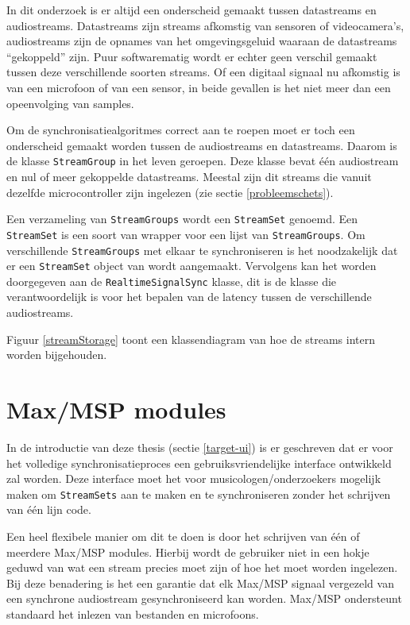In dit onderzoek is er altijd een onderscheid gemaakt tussen datastreams en audiostreams. Datastreams zijn streams afkomstig van sensoren of videocamera's, audiostreams zijn de opnames van het omgevingsgeluid waaraan de datastreams ``gekoppeld'' zijn. Puur softwarematig wordt er echter geen verschil gemaakt tussen deze verschillende soorten streams. Of een digitaal signaal nu afkomstig is van een microfoon of van een sensor, in beide gevallen is het niet meer dan een opeenvolging van samples.

Om de synchronisatiealgoritmes correct aan te roepen moet er toch een onderscheid gemaakt worden tussen de audiostreams en datastreams. Daarom is de klasse \texttt{StreamGroup} in het leven geroepen. Deze klasse bevat één audiostream en nul of meer gekoppelde datastreams. Meestal zijn dit streams die vanuit dezelfde microcontroller zijn ingelezen (zie sectie \ref{probleemschets}).

Een verzameling van \texttt{StreamGroups} wordt een \texttt{StreamSet} genoemd. Een \texttt{StreamSet} is een soort van wrapper voor een lijst van \texttt{StreamGroups}. Om verschillende \texttt{StreamGroups} met elkaar te synchroniseren is het noodzakelijk dat er een \texttt{StreamSet} object van wordt aangemaakt. Vervolgens kan het worden doorgegeven aan de  \texttt{RealtimeSignalSync} klasse, dit is de klasse die verantwoordelijk is voor het bepalen van de latency tussen de verschillende audiostreams. 

Figuur \ref{streamStorage} toont een klassendiagram van hoe de streams intern worden bijgehouden.

\section{Max/MSP modules}

In de introductie van deze thesis (sectie \ref{target-ui}) is er geschreven dat er voor het volledige synchronisatieproces een gebruiksvriendelijke interface ontwikkeld zal worden. Deze interface moet het voor musicologen/onderzoekers mogelijk maken om \texttt{StreamSets} aan te maken en te synchroniseren zonder het schrijven van één lijn code.

Een heel flexibele manier om dit te doen is door het schrijven van één of meerdere Max/MSP modules. Hierbij wordt de gebruiker niet in een hokje geduwd van wat een stream precies moet zijn of hoe het moet worden ingelezen. Bij deze benadering is het een garantie dat elk Max/MSP signaal vergezeld van een synchrone audiostream gesynchroniseerd kan worden. Max/MSP ondersteunt standaard het inlezen van bestanden en microfoons.

